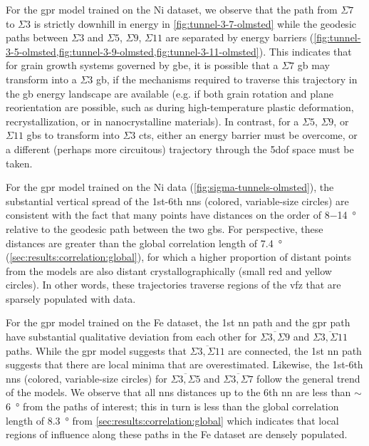\documentclass[final,twocolumn,12pt]{elsarticle}
\begin{document}
     For the \gls{gpr} model trained on the Ni \citet{olmstedSurveyComputedGrain2009a} dataset, we observe that the path from $\Sigma7$ to $\Sigma3$ is strictly downhill in energy in \cref{fig:tunnel-3-7-olmsted} while the geodesic paths between $\Sigma3$ and $\Sigma5$, $\Sigma9$, $\Sigma11$ are separated by energy barriers (\cref{fig:tunnel-3-5-olmsted,fig:tunnel-3-9-olmsted,fig:tunnel-3-11-olmsted}). This indicates that for grain growth systems governed by \gls{gbe}, it is possible that a $\Sigma7$ \gls{gb} may transform into a $\Sigma3$ \gls{gb}, if the mechanisms required to traverse this trajectory in the \gls{gb} energy landscape are available (e.g. if both grain rotation and plane reorientation are possible, such as during high-temperature plastic deformation, recrystallization, or in nanocrystalline materials). In contrast, for a $\Sigma5$, $\Sigma9$, or $\Sigma11$ \glspl{gb} to transform into $\Sigma3$ \glspl{ct}, either an energy barrier must be overcome, or a different (perhaps more circuitous) trajectory through the \gls{5dof} space must be taken.
     
     For the \gls{gpr} model trained on the Ni data (\cref{fig:sigma-tunnels-olmsted}), the substantial vertical spread of the 1st-6th \glspl{nn} (colored, variable-size circles) are consistent with the fact that many points have distances on the order of \num{8}$-$\SI{14}{\degree} relative to the geodesic path between the two \glspl{gb}. For perspective, these distances are greater than the global correlation length of \SI{7.4}{\degree} (\cref{sec:results:correlation:global}), for which a higher proportion of distant points from the models are also distant crystallographically (small red and yellow circles). In other words, these trajectories traverse regions of the \gls{vfz} that are sparsely populated with data.
     
     For the \gls{gpr} model trained on the Fe \citet{kimPhasefieldModeling3D2014} dataset, the 1st \gls{nn} path and the \gls{gpr} path have substantial qualitative deviation from each other for $\overline{\Sigma3,\Sigma9}$ and $\overline{\Sigma3,\Sigma11}$ paths. While the \gls{gpr} model suggests that $\overline{\Sigma3,\Sigma11}$ are connected, the 1st \gls{nn} path suggests that there are local minima that are overestimated. Likewise, the 1st-6th \glspl{nn} (colored, variable-size circles) for $\overline{\Sigma3,\Sigma5}$ and $\overline{\Sigma3,\Sigma7}$ follow the general trend of the models. We observe that all \glspl{nn} distances up to the 6th \gls{nn} are less than $\sim$\SI{6}{\degree} from the paths of interest; this in turn is less than the global correlation length of \SI{8.3}{\degree} from \cref{sec:results:correlation:global} which indicates that local regions of influence along these paths in the Fe dataset are densely populated.
     
\end{document}
